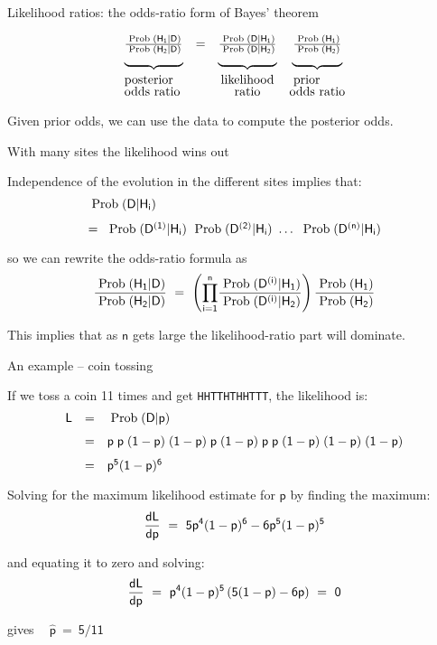 \documentclass[bluish,slideColor,colorBG,pdf]{prosper}
\def\prob{{\rm \;Prob\;}}
\begin{document}
\begin{slide}[Replace]{Likelihood ratios: the odds-ratio form of Bayes' theorem}
\bigskip

{
\[
\renewcommand{\arraystretch}{0.7}
\begin{array}{l c c c}
\mathsf{{\prob(H_1|D) \over \prob(H_2|D)}} & \mathsf{=} & \mathsf{{\prob(D|H_1) \over \prob(D|H_2)}} &  \mathsf{{\prob(H_1) \over \prob(H_2)}}\\ 
\mathsf{\underbrace{~~~~~~~~~~~~~~}} & & \mathsf{\underbrace{~~~~~~~~~~~~~~}} &
\mathsf{\underbrace{~~~~~~~~~~~~}}\\
{\rm posterior}\raisebox{2pt}{\strut} & & {\rm likelihood} & {\rm prior~~~~~}\\
{\rm odds~ratio} & & {\rm ratio} & {\rm odds~ratio}
\end{array}
\]
}
\bigskip

Given prior odds, we can use the data to compute the posterior odds.

\end{slide}

\begin{slide}[Replace]{With many sites the likelihood wins out}

Independence of the evolution in the different sites implies that:
\[
\begin{array}{l}
\mathsf{\prob(D|H_i)}\\
\\
 \mathsf{=\  \prob(D^{(1)}|H_i)\ \prob(D^{(2)}|H_i)\ \ldots\ \prob(D^{(n)}|H_i)}
\end{array}
\]

so we can rewrite the odds-ratio formula as
\[
\mathsf{{ \prob(H_1|D) \over \prob(H_2|D)}\  = \ \left({\prod_{i=1}^n}
{\prob(D^{(i)}|H_1) \over \prob(D^{(i)}|H_2) } \right) {\prob(H_1) \over \prob(H_2) }}
\]

This implies that as $\mathsf{n}$ gets large the likelihood-ratio part will
dominate.

\end{slide}

\begin{slide}[Replace]{An example -- coin tossing}

If we toss a coin 11 times and get {\tt HHTTHTHHTTT}, the likelihood is:
\[
\begin{array}{c c l}
\mathsf{L} & \mathsf{=} & \mathsf{\prob(D|p)}\\
  &   &  \\
  & \mathsf{=} &  \mathsf{p\;p\;(1-p)\;(1-p)\;p\;(1-p)\;p\;p\;(1-p)\;(1-p)\;(1-p)}\\
  &   &  \\
  & \mathsf{=} & \mathsf{p^5 (1-p)^6}
\end{array}
\]

Solving for the maximum likelihood estimate for $\mathsf{p}$ by finding the maximum:
\[
\mathsf{{dL \over dp}\  =\  5 p^4 (1-p)^6 - 6 p^5 (1-p)^5}
\]

and equating it to zero and solving:
\[
\mathsf{{dL \over dp} \ =\  p^4 (1-p)^5 \left( 5(1-p) - 6p \right) \ =\  0}
\]

gives $~~~~\mathsf{\widehat{p}\ =\ 5/11}$

\end{slide}
\end{document}
